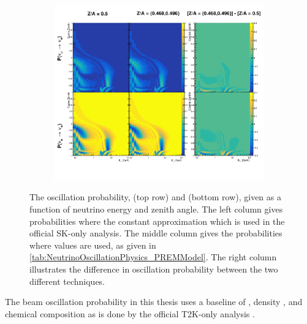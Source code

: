 \begin{figure}[h]
  \begin{subfigure}[t]{\textwidth}
    \includegraphics[width=\textwidth, trim={0mm 0mm 0mm 0mm}, clip,page=1]{Figures/Oscillation/ChemicalComposition.pdf}
  \end{subfigure}
  \caption{The oscillation probability,  (top row) and  (bottom row), given as a function of neutrino energy and zenith angle. The left column gives probabilities where the constant  approximation which is used in the official SK-only analysis. The middle column gives the probabilities where  values are used, as given in \autoref{tab:NeutrinoOscillationPhysics_PREMModel}. The right column illustrates the difference in oscillation probability between the two different techniques.}
  \label{fig:Oscillation_SK_ChemicalComposition}
\end{figure}

The beam oscillation probability in this thesis uses a baseline of , density , and chemical composition  as is done by the official T2K-only analysis \cite{Hagiwara2011}. 


